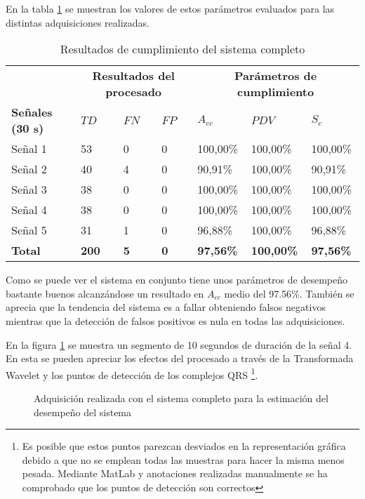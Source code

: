En la tabla \ref{tab:result} se muestran los valores de estos parámetros evaluados para las distintas adquisiciones realizadas. 


\begin{table}[H]
\center
\begin{tabular}{l|lll|lll}
      & \multicolumn{3}{c|}{\textbf{Resultados del procesado}} & \multicolumn{3}{c}{\textbf{Parámetros de cumplimiento}} \\
\cline{2-7}\textbf{Señales (30 s)} & \textbf{$TD$} & \textbf{$FN$} & \textbf{$FP$} & \textbf{$A_{cc}$} & \textbf{$PDV$} & \textbf{$S_c$}\\
\hline
Señal 1 & 53    & 0     & 0     & 100,00\% & 100,00\% & 100,00\% \\
Señal 2 & 40    & 4     & 0     & 90,91\% & 100,00\% & 90,91\% \\
Señal 3 & 38    & 0     & 0     & 100,00\% & 100,00\% & 100,00\% \\
Señal 4 & 38    & 0     & 0     & 100,00\% & 100,00\% & 100,00\% \\
Señal 5 & 31    & 1     & 0     & 96,88\% & 100,00\% & 96,88\% \\
\hline
\textbf{Total} & \textbf{200} & \textbf{5} & \textbf{0} & \textbf{97,56\%} & \textbf{100,00\%} & \textbf{97,56\%} \\
\end{tabular}%
\caption{Resultados de cumplimiento del sistema completo}
\label{tab:result}
\end{table}

Como se puede ver el sistema en conjunto tiene unos parámetros de desempeño bastante buenos alcanzándose un resultado en $A_{cc}$ medio del 97.56\%. También se aprecia que la tendencia del sistema es a fallar obteniendo falsos negativos mientras que la detección de falsos positivos es nula en todas las adquisiciones. 

En la figura \ref{fig:result} se muestra un segmento de 10 segundos de duración de la señal 4. En esta se pueden apreciar los efectos del procesado a través de la Transformada Wavelet y los puntos de detección de los complejos QRS \footnote{Es posible que estos puntos parezcan desviados en la representación gráfica debido a que no se emplean todas las muestras para hacer la misma menos pesada. Mediante MatLab y anotaciones realizadas manualmente se ha comprobado que los puntos de detección son correctos}.


\begin{figure}[!ht]
	\center
	
	\caption{Adquisición realizada con el sistema completo para la estimación del desempeño del sistema}
	\label{fig:result}
\end{figure}


